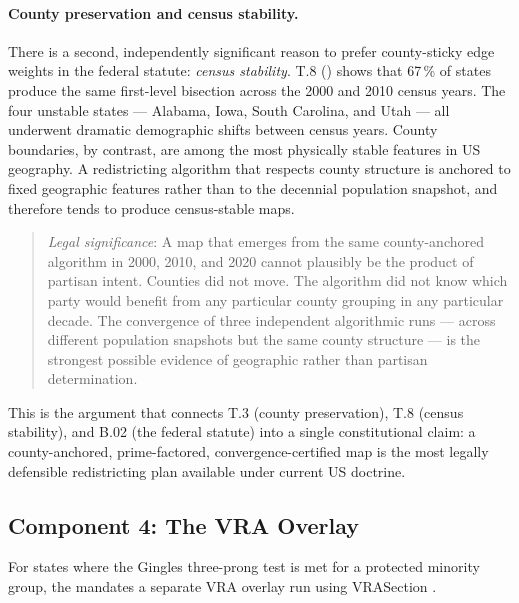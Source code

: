 \paragraph{County preservation and census stability.}
There is a second, independently significant reason to prefer county-sticky
edge weights in the federal statute: \emph{census stability}.
T.8 (\citealt{b15paper}) shows that 67\,\% of states produce the same
first-level bisection across the 2000 and 2010 census years.
The four unstable states --- Alabama, Iowa, South Carolina, and Utah --- all
underwent dramatic demographic shifts between census years.
County boundaries, by contrast, are among the most physically stable
features in US geography.
A redistricting algorithm that respects county structure is anchored to
fixed geographic features rather than to the decennial population snapshot,
and therefore tends to produce census-stable maps.

\begin{quote}
\textit{Legal significance}: A map that emerges from the same county-anchored
algorithm in 2000, 2010, and 2020 cannot plausibly be the product of partisan
intent.
Counties did not move.
The algorithm did not know which party would benefit from any particular
county grouping in any particular decade.
The convergence of three independent algorithmic runs --- across different
population snapshots but the same county structure --- is the strongest
possible evidence of geographic rather than partisan determination.
\end{quote}

This is the argument that connects T.3 (county preservation), T.8 (census
stability), and B.02 (the federal statute) into a single constitutional claim:
a county-anchored, prime-factored, convergence-certified map is the most
legally defensible redistricting plan available under current US doctrine.

\subsection{Component 4: The VRA Overlay}

For states where the Gingles three-prong test is met for a protected minority
group, the \dia{} mandates a separate VRA overlay run using VRASection \citep{b14paper}.

